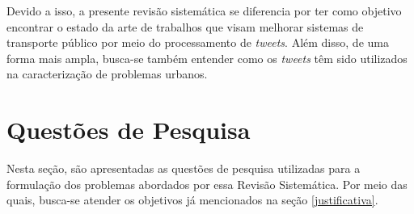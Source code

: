\documentclass[
	12pt,				%
	oneside,			%
	a4paper,			%
	english,			%
	brazil				%
	]{abntex2ppgsi}
\begin{document}
Devido a isso, a presente revisão sistemática se diferencia por ter como objetivo encontrar o estado da arte de trabalhos que visam melhorar sistemas de transporte público por meio do processamento de \textit{tweets}. Além disso, de uma forma mais ampla, busca-se também entender como os \textit{tweets} têm sido utilizados na caracterização  de problemas urbanos.

\section{Questões de Pesquisa}
\label{questoes}
Nesta seção, são apresentadas as questões de pesquisa utilizadas para a formulação dos problemas abordados por essa Revisão Sistemática. Por meio das quais, busca-se atender os objetivos já mencionados na seção \ref{justificativa}.
\end{document}

